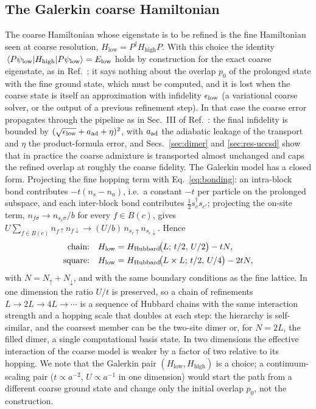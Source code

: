 \documentclass[
  aps,
  prc,
  reprint,
  superscriptaddress,
  floatfix,
  nofootinbib
]{revtex4-2}
\newcommand{\Hlow}{H_{\mathrm{low}}}
\newcommand{\Hhigh}{H_{\mathrm{high}}}
\begin{document}
\subsection{The Galerkin coarse Hamiltonian}
\label{sec:galerkin}
The coarse Hamiltonian whose eigenstate is to be refined is the fine
Hamiltonian seen at coarse resolution, $\Hlow=P^\dagger\Hhigh P$.  With this
choice the identity $\expval{\Hhigh}{P\psi_{\rm low}}=E_{\rm low}$ holds by
construction for the exact coarse eigenstate, as in
Ref.~\cite{EigenQPairing2026}; it says nothing about the overlap $p_0$ of
the prolonged state with the fine ground state, which must be computed, and
it is lost when the coarse state is itself an approximation with infidelity
$\epsilon_{\rm low}$ (a variational coarse solver, or the output of a
previous refinement step).  In that case the coarse error propagates through
the pipeline as in Sec.~III of Ref.~\cite{EigenQPairing2026}: the final
infidelity is bounded by $(\sqrt{\epsilon_{\rm low}}+a_{\rm ad}+\eta)^2$,
with $a_{\rm ad}$ the adiabatic leakage of the transport and $\eta$ the
product-formula error, and Secs.~\ref{sec:dimer} and \ref{sec:res-uccsd}
show that in practice the coarse admixture is transported almost unchanged
and caps the refined overlap at roughly the coarse fidelity.  The Galerkin
model has a closed form.  Projecting the fine hopping term with Eq.~\eqref{eq:bonding}:
an intra-block bond contributes $-t(n_s-n_a)$, i.e.\ a constant $-t$ per
particle on the prolonged subspace, and each inter-block bond contributes
$\tfrac12 s^\dagger_c s_{c'}$; projecting the on-site term,
$n_{f\sigma}\to n_{s_c\sigma}/b$ for every $f\in B(c)$, gives
$U\sum_{f\in B(c)}n_{f\uparrow}n_{f\downarrow}\to(U/b)\,n_{s_c\uparrow}n_{s_c\downarrow}$.
Hence
\begin{align}
  \text{chain:}\quad &\Hlow=H_{\rm Hubbard}\!\big(L;\,t/2,\,U/2\big)-tN, \label{eq:gal1d}\\
  \text{square:}\quad&\Hlow=H_{\rm Hubbard}\!\big(L\times L;\,t/2,\,U/4\big)-2tN, \label{eq:gal2d}
\end{align}
with $N=N_\uparrow+N_\downarrow$, and with the same boundary conditions as the
fine lattice.  In one dimension the ratio $U/t$ is preserved, so a chain of
refinements $L\to2L\to4L\to\cdots$ is a sequence of Hubbard chains with the
same interaction strength and a hopping scale that doubles at each step: the
hierarchy is self-similar, and the coarsest member can be the two-site dimer
or, for $N=2L$, the filled dimer, a single computational basis state.  In
two dimensions the effective interaction of the coarse model is weaker by a
factor of two relative to its hopping.  We note that the Galerkin pair
$(\Hlow,\Hhigh)$ is a choice; a continuum-scaling pair ($t\propto a^{-2}$,
$U\propto a^{-1}$ in one dimension) would start the path from a different
coarse ground state and change only the initial overlap $p_0$, not the
construction.
\end{document}
